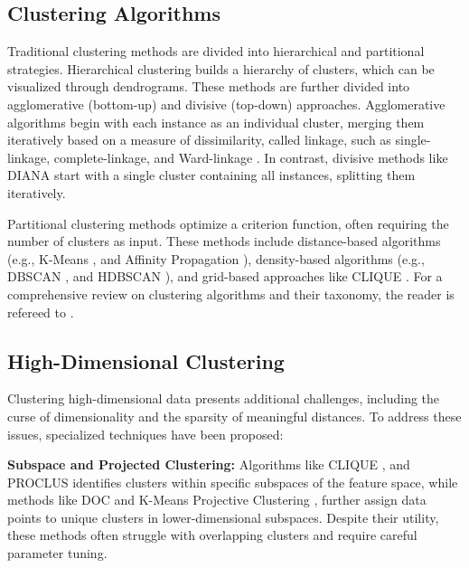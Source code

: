 \subsection{Clustering Algorithms}


Traditional clustering methods are divided into hierarchical and partitional strategies. Hierarchical clustering builds a hierarchy of clusters, which can be visualized through dendrograms. These methods are further divided into agglomerative (bottom-up) and divisive (top-down) approaches. Agglomerative algorithms begin with each instance as an individual cluster, merging them iteratively based on a measure of dissimilarity, called linkage, such as single-linkage, complete-linkage, and Ward-linkage \cite{agglomerative1984}. In contrast, divisive methods like DIANA \cite{diana1990} start with a single cluster containing all instances, splitting them iteratively.

Partitional clustering methods optimize a criterion function, often requiring the number of clusters as input. These methods include distance-based algorithms (e.g., K-Means \cite{kmeans_complexity}, and Affinity Propagation \cite{affinitypropagation2007}), density-based algorithms (e.g., DBSCAN \cite{dbscan1996}, and HDBSCAN \cite{hdbscan2013}), and grid-based approaches like CLIQUE \cite{clique1999}. For a comprehensive review on clustering algorithms and their taxonomy, the reader is refereed to \cite{dataclustering1999, surveyclustering2005, reviewclustering2017, comprehensivesurvey2022}.


\subsection{High-Dimensional Clustering}


Clustering high-dimensional data presents additional challenges, including the curse of dimensionality and the sparsity of meaningful distances. To address these issues, specialized techniques have been proposed:

\textbf{Subspace and Projected Clustering:} Algorithms like CLIQUE \cite{clique1999}, and PROCLUS \cite{proclus2000} identifies clusters within specific subspaces of the feature space, while methods like DOC \cite{DOC2002} and K-Means Projective Clustering \cite{kmeansprojective2004}, further assign data points to unique clusters in lower-dimensional subspaces. Despite their utility, these methods often struggle with overlapping clusters and require careful parameter tuning.

